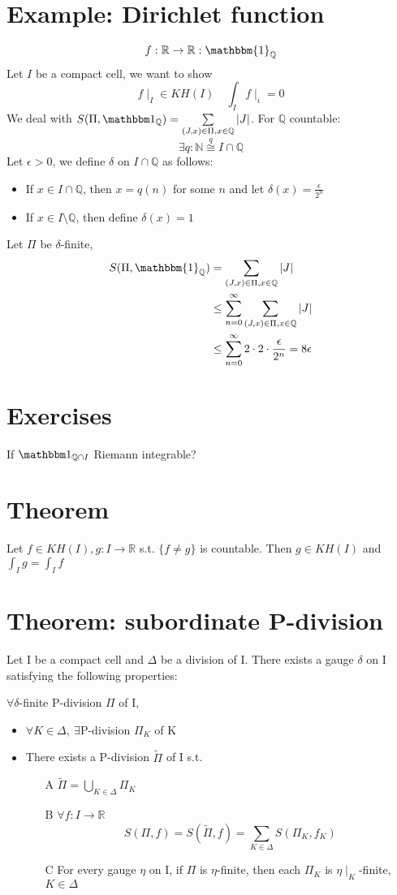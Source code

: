 \documentclass{book}
\newcommand{\abs}[1]{\left\lvert #1 \right\rvert}
\begin{document}
\section{Example: Dirichlet function}
$$f:\mathbb R\rightarrow\mathbb R:\mathbbm{1}_{\mathbb Q}$$
Let $I$ be a compact cell, we want to show
$$f\mid_I\in KH(I)\quad\int_If\mid_i=0$$
We deal with $S(\Pi,\mathbbm 1_{\mathbb Q})=\sum\limits_{(J,x)\in \Pi,x\in \mathbb Q}\abs{J}$. For $\mathbb Q$ countable:
$$\exists q:\mathbb N\stackrel{q}{\cong}I\cap \mathbb Q$$
Let $\epsilon>0$, we define $\delta$ on $I\cap\mathbb Q$ as follows:\begin{itemize}
    \item If $x\in I\cap \mathbb Q$, then $x=q(n)$ for some $n$ and let $\delta(x)=\frac{\epsilon}{2^n}$
    \item If $x\in I\setminus\mathbb Q$, then define $\delta(x)=1$
\end{itemize}
Let $\Pi$ be $\delta$-finite,
$$\begin{aligned}
    S(\Pi,\mathbbm{1}_{\mathbb Q})&=\sum\limits_{(J,x)\in \Pi,x\in \mathbb Q}\abs{J}\\
    &\leq\sum\limits_{n=0}^\infty\sum\limits_{(J,x)\in \Pi,x\in \mathbb Q}\abs J\\
    &\leq \sum\limits_{n=0}^\infty2\cdot2\cdot\frac{\epsilon}{2^n}=8\epsilon
\end{aligned}$$
\section*{Exercises}
If $\mathbbm 1_{\mathbb Q\cap I}$ Riemann integrable?
\section{Theorem}
Let $f\in KH(I),g:I\rightarrow\mathbb R$ s.t. $\{f\neq g\}$ is countable. Then $g\in KH(I)$ and $\int_Ig=\int_If$
\section{Theorem: subordinate P-division}
Let I be a compact cell and $\Delta$ be a division of I. There exists a gauge $\delta$ on I satisfying the following properties:

$\forall \delta$-finite P-division $\Pi$ of I,
\begin{itemize}
    \item $\forall K\in \Delta,\ \exists$P-division $\Pi_K$ of K
    \item There exists a P-division $\tilde\Pi$ of I s.t.\begin{itemize}
        \item [A]$\tilde{\Pi}=\bigcup\limits_{K\in \Delta}\Pi_K$
        \item [B]$\forall f:I\rightarrow\mathbb R$$$S(\Pi,f)=S(\tilde\Pi,f)=\sum\limits_{K\in \Delta}S(\Pi_K,f_K)$$
        \item [C]For every gauge $\eta$ on I, if $\Pi$ is $\eta$-finite, then each $\Pi_K$ is $\eta\mid_K$-finite, $K\in \Delta$
    \end{itemize}
\end{itemize}
\end{document}

